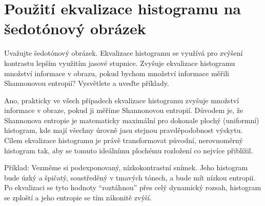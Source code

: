 \section{Použití ekvalizace histogramu na šedotónový obrázek}
Uvažujte šedotónový obrázek. Ekvalizace histogramu se využívá pro zvýšení kontrastu lepším využitím jasové 
stupnice. Zvyšuje ekvalizace histogramu množství informace v obrazu, pokud bychom množství informace měřili Shannonovou 
entropií? Vysvětlete a uveďte příklady.

Ano, prakticky ve všech případech ekvalizace histogramu zvyšuje množství informace v obraze, pokud ji měříme Shannonovou 
entropií. Důvodem je, že Shannonova entropie je matematicky maximální pro dokonale plochý (uniformní) histogram, kde 
mají všechny úrovně jasu stejnou pravděpodobnost výskytu. Cílem ekvalizace histogramu je právě transformovat původní, 
nerovnoměrný histogram tak, aby se tomuto ideálnímu plochému rozložení co nejvíce přiblížil.

Příklad: Vezměme si podexponovaný, nízkokontrastní snímek. Jeho histogram bude úzký a špičatý, soustředěný v tmavých 
tónech, a bude mít nízkou entropii. Po ekvalizaci se tyto hodnoty \enquote{roztáhnou} přes celý dynamický rozsah, 
histogram se zploští a jeho entropie se tím zákonitě zvýší.